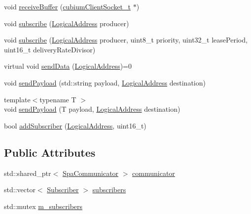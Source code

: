\begin{DoxyCompactItemize}
void \hyperlink{classComponent_a9f81ad79e0243e6e52ae04b26e6657ab}{receive\+Buffer} (\hyperlink{structcubiumClientSocket__t}{cubium\+Client\+Socket\+\_\+t} $\ast$)
\item 
void \hyperlink{classComponent_a55c74b1c2dcde114cb329ae43a4cd04a}{subscribe} (\hyperlink{structLogicalAddress}{Logical\+Address} producer)
\item 
void \hyperlink{classComponent_abae1852e26a7bee748898ea8ef6f4fb9}{subscribe} (\hyperlink{structLogicalAddress}{Logical\+Address} producer, uint8\+\_\+t priority, uint32\+\_\+t lease\+Period, uint16\+\_\+t delivery\+Rate\+Divisor)
\item 
virtual void \hyperlink{classComponent_a492a20dc97b9563d80443dda2f1057ec}{send\+Data} (\hyperlink{structLogicalAddress}{Logical\+Address})=0
\item 
void \hyperlink{classComponent_afc9525526fdc44c64873abf80357c3be}{send\+Payload} (std\+::string payload, \hyperlink{structLogicalAddress}{Logical\+Address} destination)
\item 
{\footnotesize template$<$typename T $>$ }\\void \hyperlink{classComponent_af7ee2839809098ffd50029375aa3e5a7}{send\+Payload} (T payload, \hyperlink{structLogicalAddress}{Logical\+Address} destination)
\item 
bool \hyperlink{classComponent_a54c0c489eec4e4f6b23655a734fc00d4}{add\+Subscriber} (\hyperlink{structLogicalAddress}{Logical\+Address}, uint16\+\_\+t)
\end{DoxyCompactItemize}
\subsection*{Public Attributes}
\begin{DoxyCompactItemize}
\item 
std\+::shared\+\_\+ptr$<$ \hyperlink{classSpaCommunicator}{Spa\+Communicator} $>$ \hyperlink{classComponent_ab124decba1547f96b7df055e3b7e902e}{communicator}
\item 
std\+::vector$<$ \hyperlink{structSubscriber}{Subscriber} $>$ \hyperlink{classComponent_a4b1fc3511ba706058d5e575e5b4b55f7}{subscribers}
\item 
std\+::mutex \hyperlink{classComponent_ad289c568dee48290561f885d69f09d94}{m\+\_\+subscribers}
\end{DoxyCompactItemize}
